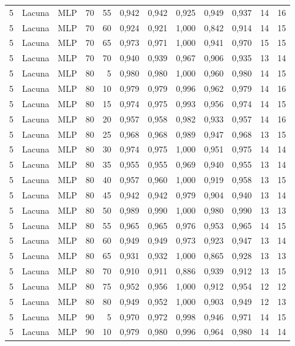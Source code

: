 \begin{longtable}{@{}rllrrrrrrrrr@{}}
5 & Lacuna & MLP & 70 & 55 & 0,942 & 0,942 & 0,925 & 0,949 & 0,937 & 14 & 16 \\
5 & Lacuna & MLP & 70 & 60 & 0,924 & 0,921 & 1,000 & 0,842 & 0,914 & 14 & 15 \\
5 & Lacuna & MLP & 70 & 65 & 0,973 & 0,971 & 1,000 & 0,941 & 0,970 & 15 & 15 \\
5 & Lacuna & MLP & 70 & 70 & 0,940 & 0,939 & 0,967 & 0,906 & 0,935 & 13 & 14 \\
5 & Lacuna & MLP & 80 & 5 & 0,980 & 0,980 & 1,000 & 0,960 & 0,980 & 14 & 15 \\
5 & Lacuna & MLP & 80 & 10 & 0,979 & 0,979 & 0,996 & 0,962 & 0,979 & 14 & 16 \\
5 & Lacuna & MLP & 80 & 15 & 0,974 & 0,975 & 0,993 & 0,956 & 0,974 & 14 & 15 \\
5 & Lacuna & MLP & 80 & 20 & 0,957 & 0,958 & 0,982 & 0,933 & 0,957 & 14 & 16 \\
5 & Lacuna & MLP & 80 & 25 & 0,968 & 0,968 & 0,989 & 0,947 & 0,968 & 13 & 15 \\
5 & Lacuna & MLP & 80 & 30 & 0,974 & 0,975 & 1,000 & 0,951 & 0,975 & 14 & 14 \\
5 & Lacuna & MLP & 80 & 35 & 0,955 & 0,955 & 0,969 & 0,940 & 0,955 & 13 & 14 \\
5 & Lacuna & MLP & 80 & 40 & 0,957 & 0,960 & 1,000 & 0,919 & 0,958 & 13 & 15 \\
5 & Lacuna & MLP & 80 & 45 & 0,942 & 0,942 & 0,979 & 0,904 & 0,940 & 13 & 14 \\
5 & Lacuna & MLP & 80 & 50 & 0,989 & 0,990 & 1,000 & 0,980 & 0,990 & 13 & 13 \\
5 & Lacuna & MLP & 80 & 55 & 0,965 & 0,965 & 0,976 & 0,953 & 0,965 & 14 & 15 \\
5 & Lacuna & MLP & 80 & 60 & 0,949 & 0,949 & 0,973 & 0,923 & 0,947 & 13 & 14 \\
5 & Lacuna & MLP & 80 & 65 & 0,931 & 0,932 & 1,000 & 0,865 & 0,928 & 13 & 13 \\
5 & Lacuna & MLP & 80 & 70 & 0,910 & 0,911 & 0,886 & 0,939 & 0,912 & 13 & 15 \\
5 & Lacuna & MLP & 80 & 75 & 0,952 & 0,956 & 1,000 & 0,912 & 0,954 & 12 & 12 \\
5 & Lacuna & MLP & 80 & 80 & 0,949 & 0,952 & 1,000 & 0,903 & 0,949 & 12 & 13 \\
5 & Lacuna & MLP & 90 & 5 & 0,970 & 0,972 & 0,998 & 0,946 & 0,971 & 14 & 15 \\
5 & Lacuna & MLP & 90 & 10 & 0,979 & 0,980 & 0,996 & 0,964 & 0,980 & 14 & 14 \\

\end{longtable}
